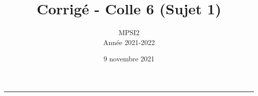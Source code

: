 \documentclass[a4paper, 11pt,openany]{article}%
\title{Corrigé - Colle 6 (Sujet 1)}
\author{MPSI2\\
Année 2021-2022}
\date{9 novembre 2021}
\theoremstyle{plain}
\theoremstyle{definition}
\newtheorem{cours}{Question de cours}
\newtheorem{exo}{Exercice}
\theoremstyle{remark}
\begin{document}
   \maketitle
      \rule{\linewidth}{0.5mm}


%
%
\end{document}
